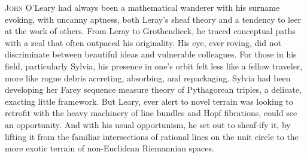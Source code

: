 % 
% 
% 
% 
% 
% 
% 
\newpage
\lettrine{J}{ohn} O’Leary had always been a mathematical wanderer with his surname evoking, with uncanny aptness, both Leray’s sheaf theory and a tendency to leer at the work of others. From Leray to Grothendieck, he traced conceptual paths with a zeal that often outpaced his originality. His eye, ever roving, did not discriminate between beautiful ideas and vulnerable colleagues. For those in his field, particularly Sylvia, his presence in one’s orbit felt less like a fellow traveler, more like rogue debris accreting, absorbing, and repackaging. Sylvia had been developing her Farey sequence measure theory of Pythagorean triples, a delicate, exacting little framework. But Leary, ever alert to novel terrain was looking to retrofit with the heavy machinery of line bundles and Hopf fibrations, could see an opportunity. And with his usual opportunism, he set out to sheaf-ify it, by lifting it from the familiar intersections of rational lines on the unit circle to the more exotic terrain of non-Euclidean Riemannian spaces.





